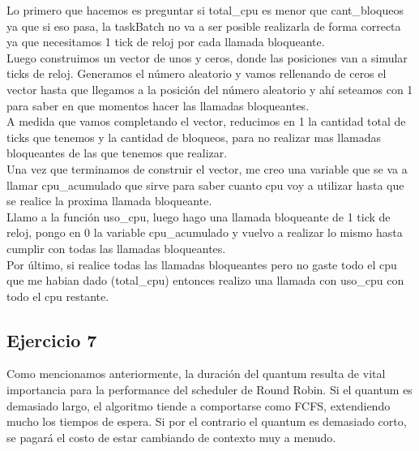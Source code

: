 Lo primero que hacemos es preguntar si total\_cpu es menor que cant\_bloqueos ya que si eso pasa,
la taskBatch no va a ser posible realizarla de forma correcta ya que necesitamos 1 tick de reloj por
cada llamada bloqueante. \\

Luego construimos un vector de unos y ceros, donde las posiciones van a simular ticks de reloj.
Generamos el número aleatorio y vamos rellenando de ceros el vector hasta que llegamos a la
posición del número aleatorio y ahí seteamos con 1 para saber en que momentos hacer las llamadas
bloqueantes. \\

A medida que vamos completando el vector, reducimos en 1 la cantidad total de ticks que tenemos
y la cantidad de bloqueos, para no realizar mas llamadas bloqueantes de las que tenemos que
realizar. \\

Una vez que terminamos de construir el vector, me creo una variable que se va a llamar
cpu\_acumulado que sirve para saber cuanto cpu voy a utilizar hasta que se realice la proxima
llamada bloqueante. \\

Llamo a la función uso\_cpu, luego hago una llamada bloqueante de 1 tick de reloj, pongo en 0 la
variable cpu\_acumulado y vuelvo a realizar lo mismo hasta cumplir con todas las llamadas
bloqueantes. \\

Por último, si realice todas las llamadas bloqueantes pero no gaste todo el cpu que me habian dado
(total\_cpu) entonces realizo una llamada con uso\_cpu con todo el cpu restante.\\


\subsection{Ejercicio 7}

Como mencionamos anteriormente, la duración del quantum resulta de vital importancia para la performance del scheduler de Round Robin. Si el quantum es demasiado largo, el algoritmo tiende a comportarse como FCFS, extendiendo mucho los tiempos de espera. Si por el contrario el quantum es demasiado corto, se pagará el costo de estar cambiando de contexto muy a menudo.\\

